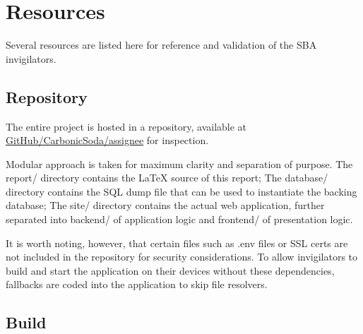 \section{Resources}
\label{overview.src}

Several resources are listed here for reference and validation of the SBA invigilators.

\subsection{Repository}
\label{overview.src.repo}

The entire project is hosted in a repository, available at \href{https://github.com/CarbonicSoda/assignee}{GitHub/CarbonicSoda/assignee}
for inspection.

Modular approach is taken for maximum clarity and separation of purpose. The
report/ directory contains the \LaTeX{} source of this report; The database/
directory contains the SQL dump file that can be used to instantiate the backing
database; The site/ directory contains the actual web application, further separated
into backend/ of application logic and frontend/ of presentation logic.

It is worth noting, however, that certain files such as .env files or SSL certs
are not included in the repository for security considerations. To allow invigilators
to build and start the application on their devices without these dependencies,
fallbacks are coded into the application to skip file resolvers.

\subsection{Build}
\label{overview.src.build}

